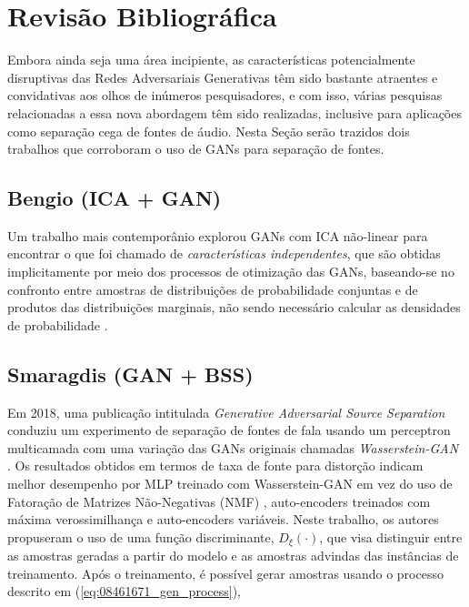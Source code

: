 \section{Revisão Bibliográfica}
\label{sec:gan_for_bss_bib_review}

Embora ainda seja uma área incipiente, as características potencialmente disruptivas das Redes Adversariais Generativas têm sido bastante atraentes e convidativas aos olhos de inúmeros pesquisadores, e com isso, várias pesquisas relacionadas a essa nova abordagem têm sido realizadas, inclusive para aplicações como separação cega de fontes de áudio. Nesta Seção serão trazidos dois trabalhos que corroboram o uso de GANs para separação de fontes.

\subsection{Bengio (ICA + GAN)}
\label{subsec:gan_for_bss_ica_gan}

Um trabalho mais contemporânio explorou GANs com ICA não-linear para encontrar o que foi chamado de \textit{características independentes}, que são obtidas implicitamente por meio dos processos de otimização das GANs, baseando-se no confronto entre amostras de distribuições de probabilidade conjuntas e de produtos das distribuições marginais, não sendo necessário calcular as densidades de probabilidade \citep{brakel2017learning}.



\subsection{Smaragdis (GAN + BSS)}
\label{subsec:gan_for_bss_gan_bss}

Em 2018, uma publicação intitulada \textit{Generative Adversarial Source Separation} \citep{8461671} conduziu um experimento de separação de fontes de fala usando um perceptron multicamada com uma variação das GANs originais chamadas \textit{Wasserstein-GAN} \citep{arjovsky2017wasserstein}. Os resultados obtidos em termos de taxa de fonte para distorção indicam melhor desempenho por MLP treinado com Wasserstein-GAN em vez do uso de Fatoração de Matrizes Não-Negativas (NMF) \citep{lee1999learning}, auto-encoders treinados com máxima verossimilhança e auto-encoders variáveis. Neste trabalho, os autores propuseram o uso de uma função discriminante, $D_{\xi}\left(\cdot\right)$, que visa distinguir entre as amostras geradas a partir do modelo e as amostras advindas das instâncias de treinamento. Após o treinamento, é possível gerar amostras usando o processo descrito em (\ref{eq:08461671_gen_process}),

